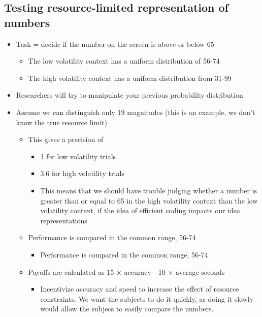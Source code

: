 \subsection{Testing resource-limited representation of numbers}
\begin{itemize}
    \item Task = decide if the number on the screen is above or below 65
    \begin{itemize}
        \item The low volatility context has a uniform distribution of 56-74
        \item The high volatility context has a uniform distribution from 31-99
    \end{itemize}
    \item Researchers will try to manipulate your previous probability distribution
    \item Assume we can distinguish only 19 magnitudes (this is an example, we don't know the true resource limit)
    \begin{itemize}
        \item This gives a precision of
        \begin{itemize}
            \item 1 for low volatility trials
            \item 3.6 for high volatility trials
               \item This means that we should have trouble judging whether a number is greater than or equal to 65 in the high volatility context than the low volatility context, if the idea of efficient coding impacts our idea representations
        \end{itemize}
     \item Performance is compared in the common range, 56-74
 \begin{itemize}
     \item Performance is compared in the common range, 56-74
 \end{itemize}
 \item Payoffs are calculated as 15 $\times$ accuracy - 10 $\times$ average seconds
\begin{itemize}
    \item Incentivize accuracy and speed to increase the effect of resource constraints. We want the subjects to do it quickly, as doing it slowly would allow the subjecs to easily compare the numbers.
\end{itemize}
    \end{itemize}
    
\end{itemize}
